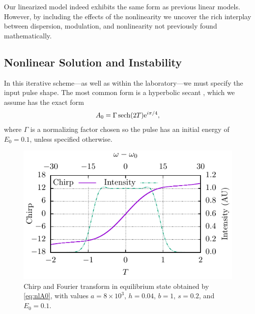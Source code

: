 \documentclass[10pt,twocolumn,a4paper]{article}
\let\originalleft\left
\let\originalright\right
\renewcommand{\left}{\mathopen{}\mathclose\bgroup\originalleft}
\renewcommand{\right}{\aftergroup\egroup\originalright}
\DeclareMathOperator{\sech}{sech}
\begin{document}
Our linearized model indeed exhibits the same form as previous linear models. However, by including the effects of the nonlinearity we uncover the rich interplay between dispersion, modulation, and nonlinearity not previously found mathematically.

\subsection{Nonlinear Solution and Instability}
\label{sec:nlresults}
In this iterative scheme---as well as within the laboratory---we must specify the input pulse shape. The most common form is a hyperbolic secant \cite{coen1997, finot2008, mitschke1986, rothenberg1989b, tomlinson1984}, which we assume has the exact form
\begin{align}
	A_0 = \Gamma \sech \left( 2 T \right) \textrm{e}^{i \pi / 4},
	\label{eq:nlA0}
\end{align}
where $\Gamma$ is a normalizing factor chosen so the pulse has an initial energy of $E_0 = 0.1$, unless specified otherwise.

\begin{figure}[tbp]
	\centering
	\includegraphics{ChirpFT}
	\caption{Chirp and Fourier transform in equilibrium state obtained by \eqref{eq:nlA0}, with values $a = 8 \times 10^3$, $h = 0.04$, $b = 1$, $s = 0.2$, and $E_0 = 0.1$.}
	\label{fig:chirpft}
\end{figure}
\end{document}
